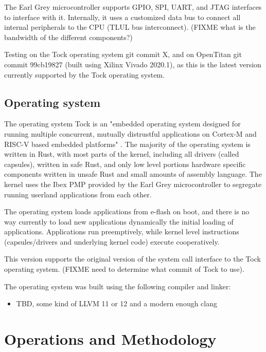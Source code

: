 \documentclass{article}
\begin{document}
The Earl Grey microcontroller supports GPIO, SPI, UART, and JTAG interfaces to interface with it. Internally, it uses a customized data bus to connect all internal peripherals to the CPU (TLUL bus interconnect). (FIXME what is the bandwidth of the different components?)

Testing on the Tock operating system git commit X, and on OpenTitan git commit 99cb19827 (built using Xilinx Vivado 2020.1), as this is the latest version currently supported by the Tock operating system.

\subsection{Operating system}

The operating system Tock is an "embedded operating system designed for running multiple concurrent, mutually distrustful applications on Cortex-M and RISC-V based embedded platforms" \cite{tockgithub}. The majority of the operating system is written in Rust, with most parts of the kernel, including all drivers (called capsules), written in safe Rust, and only low level portions hardware specific components written in unsafe Rust and small amounts of assembly language. The kernel uses the Ibex PMP provided by the Earl Grey microcontroller to segregate running userland applications from each other.

The operating system loads applications from e-flash on boot, and there is no way currently to load new applications dynamically the initial loading of applications. Applications run preemptively, while kernel level instructions (capsules/drivers and underlying kernel code) execute cooperatively.

This version supports the original version of the system call interface to the Tock operating system. (FIXME need to determine what commit of Tock to use).

The operating system was built using the following compiler and linker:
\begin{itemize}
    \item TBD, some kind of LLVM 11 or 12 and a modern enough clang
\end{itemize}

\section{Operations and Methodology}
\end{document}
